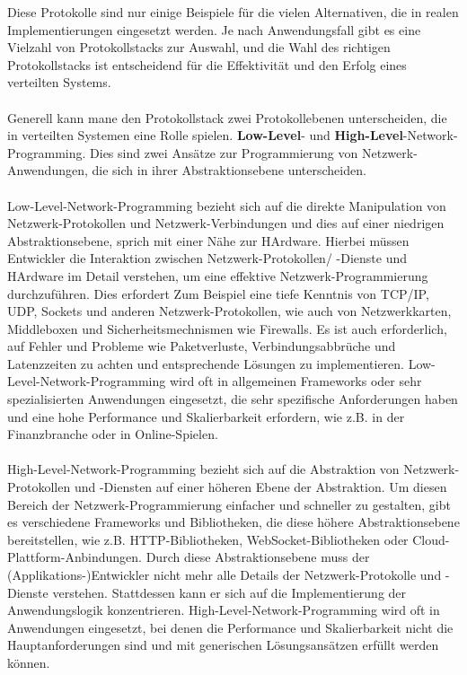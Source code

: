 Diese Protokolle sind nur einige Beispiele für die vielen Alternativen, die in realen Implementierungen eingesetzt werden. Je nach Anwendungsfall gibt es eine Vielzahl von Protokollstacks zur Auswahl, und die Wahl des richtigen Protokollstacks ist entscheidend für die Effektivität und den Erfolg eines verteilten Systems.
\\\\
Generell kann mane den Protokollstack zwei Protokollebenen unterscheiden, die in verteilten Systemen eine Rolle spielen. \textbf{Low-Level}- und \textbf{High-Level}-Network-Programming. Dies sind zwei Ansätze zur Programmierung von Netzwerk-Anwendungen, die sich in ihrer Abstraktionsebene unterscheiden.
\\\\
Low-Level-Network-Programming bezieht sich auf die direkte Manipulation von Netzwerk-Protokollen und Netzwerk-Verbindungen und dies auf einer niedrigen Abstraktionsebene, sprich mit einer Nähe zur HArdware. Hierbei müssen Entwickler die Interaktion zwischen Netzwerk-Protokollen/ -Dienste und HArdware im Detail verstehen, um eine effektive Netzwerk-Programmierung durchzuführen. Dies erfordert Zum Beispiel eine tiefe Kenntnis von TCP/IP, UDP, Sockets und anderen Netzwerk-Protokollen, wie auch von Netzwerkkarten, Middleboxen und Sicherheitsmechnismen wie Firewalls. Es ist auch erforderlich, auf Fehler und Probleme wie Paketverluste, Verbindungsabbrüche und Latenzzeiten zu achten und entsprechende Lösungen zu implementieren. Low-Level-Network-Programming wird oft in allgemeinen Frameworks oder sehr spezialisierten Anwendungen eingesetzt, die sehr spezifische Anforderungen haben und eine hohe Performance und Skalierbarkeit erfordern, wie z.B. in der Finanzbranche oder in Online-Spielen.
\\\\
High-Level-Network-Programming bezieht sich auf die Abstraktion von Netzwerk-Protokollen und -Diensten auf einer höheren Ebene der Abstraktion. Um diesen Bereich der Netzwerk-Programmierung einfacher und schneller zu gestalten, gibt es verschiedene Frameworks und Bibliotheken, die diese höhere Abstraktionsebene bereitstellen, wie z.B. HTTP-Bibliotheken, WebSocket-Bibliotheken oder Cloud-Plattform-Anbindungen. Durch diese Abstraktionsebene muss der (Applikations-)Entwickler nicht mehr alle Details der Netzwerk-Protokolle und -Dienste verstehen. Stattdessen kann er sich auf die Implementierung der Anwendungslogik konzentrieren. High-Level-Network-Programming wird oft in Anwendungen eingesetzt, bei denen die Performance und Skalierbarkeit nicht die Hauptanforderungen sind und mit generischen Lösungsansätzen erfüllt werden können.  
